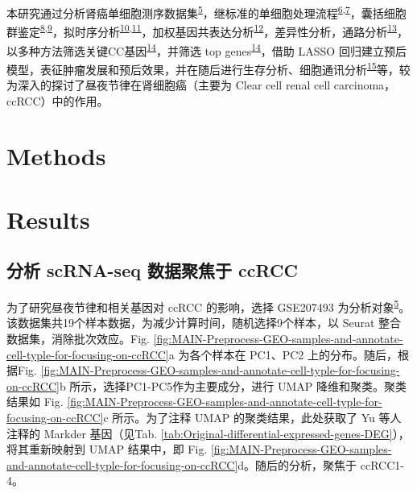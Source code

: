 \documentclass[
]{article}
\begin{document}
本研究通过分析肾癌单细胞测序数据集\textsuperscript{\protect\hyperlink{ref-IntegrativeSinYuZh2023}{5}}，继标准的单细胞处理流程\textsuperscript{\protect\hyperlink{ref-IntegratedAnalHaoY2021}{6},\protect\hyperlink{ref-ComprehensiveIStuart2019}{7}}，囊括细胞群鉴定\textsuperscript{\protect\hyperlink{ref-SupervisedClasPliner2019}{8},\protect\hyperlink{ref-ReferenceBasedAran2019}{9}}，拟时序分析\textsuperscript{\protect\hyperlink{ref-ReversedGraphQiuX2017}{10},\protect\hyperlink{ref-TheDynamicsAnTrapne2014}{11}}，加权基因共表达分析\textsuperscript{\protect\hyperlink{ref-WgcnaAnRPacLangfe2008}{12}}，差异性分析，通路分析\textsuperscript{\protect\hyperlink{ref-ClusterprofilerWuTi2021}{13}}，以多种方法筛选关键CC基因\textsuperscript{\protect\hyperlink{ref-EfsAnEnsemblNeuman2017}{14}}，并筛选 top genes\textsuperscript{\protect\hyperlink{ref-EfsAnEnsemblNeuman2017}{14}}，借助 LASSO 回归建立预后模型，表征肿瘤发展和预后效果，并在随后进行生存分析、细胞通讯分析\textsuperscript{\protect\hyperlink{ref-InferenceAndAJinS2021}{15}}等，较为深入的探讨了昼夜节律在肾细胞癌（主要为 Clear cell renal cell carcinoma，ccRCC）中的作用。

\hypertarget{methods}{%
\section{Methods}\label{methods}}

\hypertarget{results}{%
\section{Results}\label{results}}

\hypertarget{ux5206ux6790-scrna-seq-ux6570ux636eux805aux7126ux4e8e-ccrcc}{%
\subsection{分析 scRNA-seq 数据聚焦于 ccRCC}\label{ux5206ux6790-scrna-seq-ux6570ux636eux805aux7126ux4e8e-ccrcc}}

为了研究昼夜节律和相关基因对 ccRCC 的影响，选择 GSE207493 为分析对象\textsuperscript{\protect\hyperlink{ref-IntegrativeSinYuZh2023}{5}}。该数据集共19个样本数据，为减少计算时间，随机选择9个样本，以 Seurat 整合数据集，消除批次效应。Fig. \ref{fig:MAIN-Preprocess-GEO-samples-and-annotate-cell-typle-for-focusing-on-ccRCC}a 为各个样本在 PC1、PC2 上的分布。随后，根据Fig. \ref{fig:MAIN-Preprocess-GEO-samples-and-annotate-cell-typle-for-focusing-on-ccRCC}b 所示，选择PC1-PC5作为主要成分，进行 UMAP 降维和聚类。聚类结果如 Fig. \ref{fig:MAIN-Preprocess-GEO-samples-and-annotate-cell-typle-for-focusing-on-ccRCC}c 所示。为了注释 UMAP 的聚类结果，此处获取了 Yu 等人注释的 Markder 基因（见Tab. \ref{tab:Original-differential-expressed-genes-DEG}），将其重新映射到 UMAP 结果中，即 Fig. \ref{fig:MAIN-Preprocess-GEO-samples-and-annotate-cell-typle-for-focusing-on-ccRCC}d。随后的分析，聚焦于 ccRCC1-4。
\end{document}
